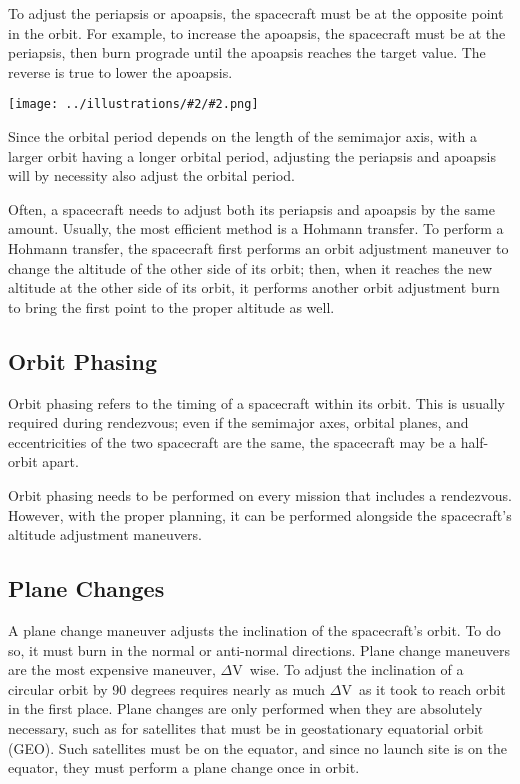 \documentclass[oneside,a5paper]{book}
\newcommand{\dv}{$\Delta$\hspace{-0.2ex}V}
\newcommand{\widthillustration}[2]{{\centering\texttt{[image: ../illustrations/\#2/\#2.png]}}}
\newcommand{\illustration}[1]{\widthillustration{\linewidth}{#1}}
\begin{document}
To adjust the periapsis or apoapsis, the spacecraft must be at the
opposite point in the orbit. For example, to increase the apoapsis,
the spacecraft must be at the periapsis, then burn prograde until the
apoapsis reaches the target value. The reverse is true to lower the
apoapsis.

\illustration{raise-apoapsis}

Since the orbital period depends on the length of the semimajor axis,
with a larger orbit having a longer orbital period, adjusting the
periapsis and apoapsis will by necessity also adjust the orbital
period.

Often, a spacecraft needs to adjust both its periapsis and apoapsis by
the same amount. Usually, the most efficient method is a Hohmann
transfer. To perform a Hohmann transfer, the spacecraft first performs
an orbit adjustment maneuver to change the altitude of the other side
of its orbit; then, when it reaches the new altitude at the other side
of its orbit, it performs another orbit adjustment burn to bring the
first point to the proper altitude as well.

\subsection{Orbit Phasing}

Orbit phasing refers to the timing of a spacecraft within its
orbit. This is usually required during rendezvous; even if the
semimajor axes, orbital planes, and eccentricities of the two
spacecraft are the same, the spacecraft may be a half-orbit
apart.

Orbit phasing needs to be performed on every mission that includes a
rendezvous. However, with the proper planning, it can be performed
alongside the spacecraft’s altitude adjustment maneuvers.

\subsection{Plane Changes}

A plane change maneuver adjusts the inclination of the spacecraft’s
orbit. To do so, it must burn in the normal or anti-normal
directions. Plane change maneuvers are the most expensive maneuver, \dv\ 
wise. To adjust the inclination of a circular orbit by 90 degrees
requires nearly as much \dv\ as it took to reach orbit in the first
place. Plane changes are only performed when they are absolutely
necessary, such as for satellites that must be in geostationary
equatorial orbit (GEO). Such satellites must be on the equator, and
since no launch site is on the equator, they must perform a plane
change once in orbit.
\end{document}

